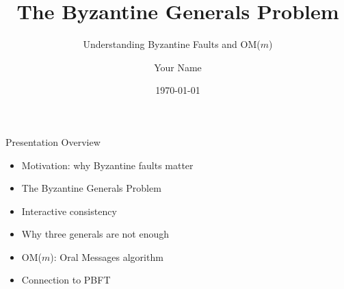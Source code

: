 \documentclass[aspectratio=169]{beamer}
\title{The Byzantine Generals Problem}
\subtitle{Understanding Byzantine Faults and OM($m$)}
\author{Your Name}
\date{\today}
\begin{document}
\begin{frame}
  \titlepage
\end{frame}

\begin{frame}{Presentation Overview}
\begin{itemize}
  \item Motivation: why Byzantine faults matter
  \item The Byzantine Generals Problem
  \item Interactive consistency
  \item Why three generals are not enough
  \item OM($m$): Oral Messages algorithm
  \item Connection to PBFT
\end{itemize}
\end{frame}
\end{document}
